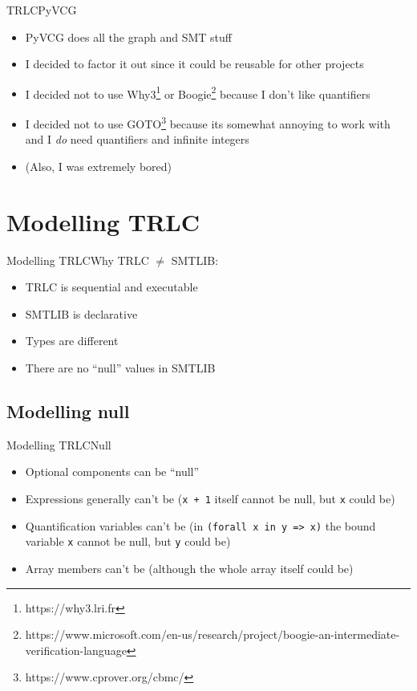 \documentclass[aspectratio=169]{beamer}
\begin{document}
\begin{frame}{TRLC}{PyVCG}
  \begin{itemize}
  \item PyVCG does all the graph and SMT stuff
  \item I decided to factor it out since it could be reusable for
    other projects
  \item I decided not to use Why3\footnote{https://why3.lri.fr} or
    Boogie\footnote{https://www.microsoft.com/en-us/research/project/boogie-an-intermediate-verification-language}
    because I don't like quantifiers
  \item I decided not to use
    GOTO\footnote{https://www.cprover.org/cbmc/} because its somewhat
    annoying to work with and I \emph{do} need quantifiers and
    infinite integers
  \item (Also, I was extremely bored)
  \end{itemize}
\end{frame}

\section{Modelling TRLC}
\begin{frame}{Modelling TRLC}{Why}
  TRLC $\neq$ SMTLIB:
  \begin{itemize}
  \item TRLC is sequential and executable
  \item SMTLIB is declarative
  \item Types are different
  \item There are no ``null'' values in SMTLIB
  \end{itemize}
\end{frame}

\subsection{Modelling null}
\begin{frame}[fragile]{Modelling TRLC}{Null}
  \begin{itemize}
  \item Optional components can be ``null''
  \item Expressions generally can't be (\verb|x + 1| itself cannot be
    null, but \verb|x| could be)
  \item Quantification variables can't be (in
    \verb|(forall x in y => x)| the bound variable \verb|x| cannot be
    null, but \verb|y| could be)
  \item Array members can't be (although the whole array itself could
    be)
  \end{itemize}
\end{frame}
\end{document}
